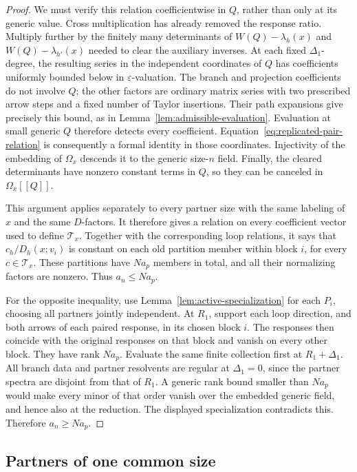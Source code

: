 \begin{proof}
We must verify this relation coefficientwise in $Q$, rather than only
at its generic value.  Cross multiplication has already removed the
response ratio.  Multiply further by the finitely many determinants
of $W(Q)-\lambda_h(x)$ and $W(Q)-\lambda_{h'}(x)$ needed to clear
the auxiliary inverses.  At each fixed $\Delta_1$-degree, the resulting
series in the independent coordinates of $Q$ has coefficients
uniformly bounded below in $\varepsilon$-valuation.  The branch and
projection coefficients do not involve $Q$; the other factors are
ordinary matrix series with two prescribed arrow steps and a fixed
number of Taylor insertions.  Their path expansions give precisely
this bound, as in Lemma~\ref{lem:admissible-evaluation}.
Evaluation at small generic $Q$ therefore detects every coefficient.
Equation~\eqref{eq:replicated-pair-relation} is consequently a
formal identity in those coordinates.  Injectivity of the embedding
of $\Omega_x$ descends it to the generic size-$n$ field.  Finally,
the cleared determinants have nonzero constant terms in $Q$, so
they can be canceled in $\Omega_x[[Q]]$.

This argument applies separately to every partner size with the same
labeling of $x$ and the same $D$-factors.  It therefore gives a
relation on every coefficient vector used to define $\mathcal T_x$.
Together with the corresponding loop relations, it says that
$c_h/D_h(x;v_i)$ is constant on each old partition member within
block $i$, for every $c\in\mathcal T_x$.  These partitions have
$Na_p$ members in total, and all their normalizing factors are
nonzero.  Thus $a_n\leq Na_p$.

For the opposite inequality, use
Lemma~\ref{lem:active-specialization} for each $P_i$, choosing all
partners jointly independent.  At $R_1$, support each loop direction,
and both arrows of each paired response, in its chosen block $i$.
The responses then coincide with the original responses on that
block and vanish on every other block.  They have rank $Na_p$.
Evaluate the same finite collection first at $R_1+\Delta_1$.
All branch data and partner resolvents are regular at
$\Delta_1=0$, since the partner spectra are disjoint from that of
$R_1$.  A generic rank bound smaller than $Na_p$ would make every
minor of that order vanish over the embedded generic field, and hence
also at the reduction.  The displayed specialization contradicts this.
Therefore $a_n\geq Na_p$.
\end{proof}

\subsection{Partners of one common size}

